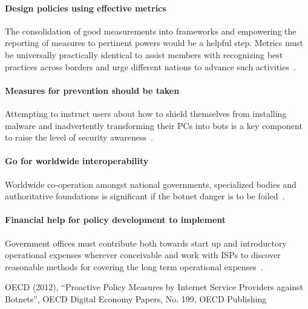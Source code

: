 \paragraph{Design policies using effective metrics}
The consolidation of good measurements into frameworks and empowering the reporting of measures to pertinent powers would be a helpful step. Metrics must be universally practically identical to assist members with recognizing best practices across borders and urge different nations to advance such activities~\cite{OECD}.

\paragraph{Measures for prevention should be taken}
Attempting to instruct users about how to shield themselves from installing malware and inadvertently transforming their PCs into bots is a key component to raise the level of security awareness~\cite{OECD}.

\paragraph{Go for worldwide interoperability}
Worldwide co-operation amongst national governments, specialized bodies and authoritative foundations is significant if the botnet danger is to be foiled~\cite{OECD}.

\paragraph{Financial help for policy development to implement}
Government offices must contribute both towards start up and introductory operational expenses wherever conceivable and work with ISPs to discover reasonable methods for covering the long term operational expenses~\cite{OECD}.


% 
OECD (2012), “Proactive Policy Measures by Internet Service Providers against Botnets”, OECD Digital Economy Papers, No. 199, OECD Publishing
